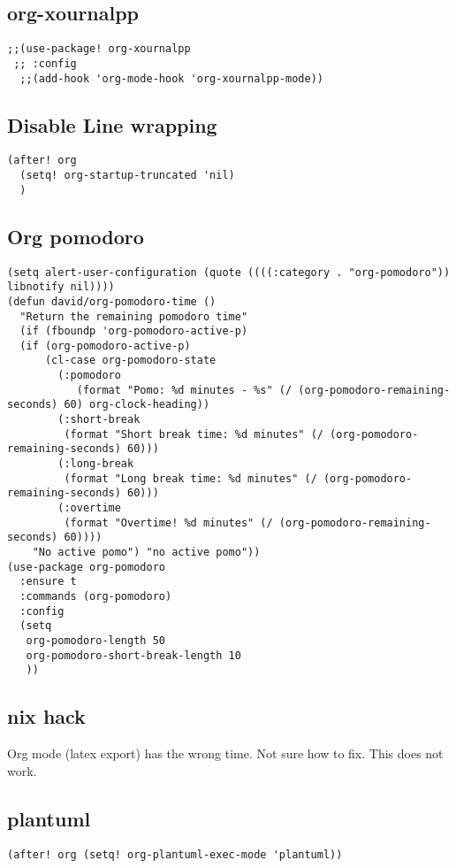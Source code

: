 \documentclass[11pt]{article}
\begin{document}
\subsection*{org-xournalpp}
\label{sec:orgee51920}
\begin{verbatim}
;;(use-package! org-xournalpp
 ;; :config
  ;;(add-hook 'org-mode-hook 'org-xournalpp-mode))

\end{verbatim}
\subsection*{Disable Line wrapping}
\label{sec:org352ab9f}
\begin{verbatim}
(after! org
  (setq! org-startup-truncated 'nil)
  )
\end{verbatim}
\subsection*{Org pomodoro}
\label{sec:org91a716b}
\begin{verbatim}
(setq alert-user-configuration (quote ((((:category . "org-pomodoro")) libnotify nil))))
(defun david/org-pomodoro-time ()
  "Return the remaining pomodoro time"
  (if (fboundp 'org-pomodoro-active-p)
  (if (org-pomodoro-active-p)
      (cl-case org-pomodoro-state
        (:pomodoro
           (format "Pomo: %d minutes - %s" (/ (org-pomodoro-remaining-seconds) 60) org-clock-heading))
        (:short-break
         (format "Short break time: %d minutes" (/ (org-pomodoro-remaining-seconds) 60)))
        (:long-break
         (format "Long break time: %d minutes" (/ (org-pomodoro-remaining-seconds) 60)))
        (:overtime
         (format "Overtime! %d minutes" (/ (org-pomodoro-remaining-seconds) 60))))
    "No active pomo") "no active pomo"))
(use-package org-pomodoro
  :ensure t
  :commands (org-pomodoro)
  :config
  (setq
   org-pomodoro-length 50
   org-pomodoro-short-break-length 10
   ))
\end{verbatim}

\subsection*{nix hack}
\label{sec:org7f4e7c7}
Org mode (latex export) has the wrong time. Not sure how to fix. This does not work.
\subsection*{plantuml}
\label{sec:org47a8b62}
\begin{verbatim}
(after! org (setq! org-plantuml-exec-mode 'plantuml))
\end{verbatim}
\end{document}
